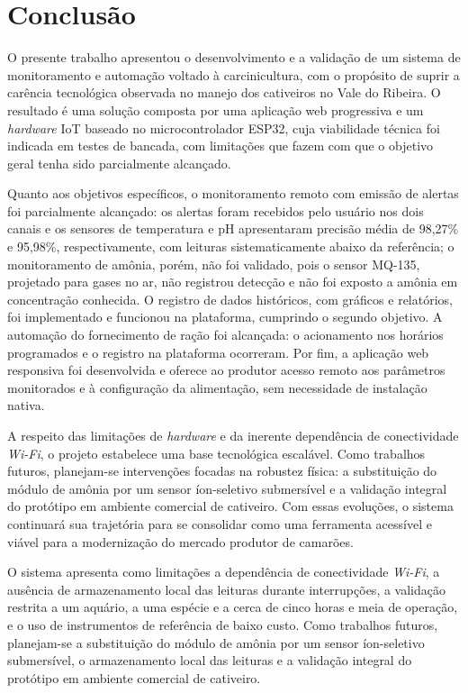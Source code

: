 \documentclass[11pt,a4paper]{article}
\begin{document}
\section{Conclusão}

O presente trabalho apresentou o desenvolvimento e a validação de um sistema de monitoramento e automação voltado à carcinicultura, com o propósito de suprir a carência tecnológica observada no manejo dos cativeiros no Vale do Ribeira. O resultado é uma solução composta por uma aplicação web progressiva e um \textit{hardware} IoT baseado no microcontrolador ESP32, cuja viabilidade técnica foi indicada em testes de bancada, com limitações que fazem com que o objetivo geral tenha sido parcialmente alcançado.

Quanto aos objetivos específicos, o monitoramento remoto com emissão de alertas foi parcialmente alcançado: os alertas foram recebidos pelo usuário nos dois canais e os sensores de temperatura e pH apresentaram precisão média de 98,27\% e 95,98\%, respectivamente, com leituras sistematicamente abaixo da referência; o monitoramento de amônia, porém, não foi validado, pois o sensor MQ-135, projetado para gases no ar, não registrou detecção e não foi exposto a amônia em concentração conhecida. O registro de dados históricos, com gráficos e relatórios, foi implementado e funcionou na plataforma, cumprindo o segundo objetivo. A automação do fornecimento de ração foi alcançada: o acionamento nos horários programados e o registro na plataforma ocorreram. Por fim, a aplicação web responsiva foi desenvolvida e oferece ao produtor acesso remoto aos parâmetros monitorados e à configuração da alimentação, sem necessidade de instalação nativa.

A respeito das limitações de \textit{hardware} e da inerente dependência de conectividade \textit{Wi-Fi}, o projeto estabelece uma base tecnológica escalável. Como trabalhos futuros, planejam-se intervenções focadas na robustez física: a substituição do módulo de amônia por um sensor íon-seletivo submersível e a validação integral do protótipo em ambiente comercial de cativeiro. Com essas evoluções, o sistema continuará sua trajetória para se consolidar como uma ferramenta acessível e viável para a modernização do mercado produtor de camarões.

O sistema apresenta como limitações a dependência de conectividade \textit{Wi-Fi}, a ausência de armazenamento local das leituras durante interrupções, a validação restrita a um aquário, a uma espécie e a cerca de cinco horas e meia de operação, e o uso de instrumentos de referência de baixo custo. Como trabalhos futuros, planejam-se a substituição do módulo de amônia por um sensor íon-seletivo submersível, o armazenamento local das leituras e a validação integral do protótipo em ambiente comercial de cativeiro.



\end{document}
